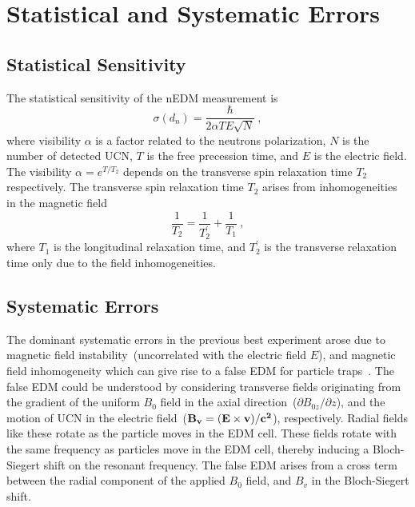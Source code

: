 \section{Statistical and Systematic Errors}
\subsection{Statistical Sensitivity}
The statistical sensitivity of the nEDM measurement is
\begin{equation}
  \label{eqn:dnsensitivity}
  \sigma(d_n) = \frac{\hbar}{2 \alpha T E \sqrt{N}}~,
\end{equation}
where visibility $\alpha$ is a factor related to the neutrons
polarization, $N$ is the number of detected UCN, $T$ is the free
precession time, and $E$ is the electric field. The visibility
$\alpha = e^{T/T_2}$ depends on the transverse spin relaxation time
$T_2$ respectively. The transverse spin relaxation time $T_2$ arises
from inhomogeneities in the magnetic field 
\begin{equation}
\frac{1}{T_2} = \frac{1}{T_2^{\prime}}+\frac{1}{T_1}~,
\end{equation}
where $T_1$ is the longitudinal relaxation time, and $T_2^{\prime}$ is
the transverse relaxation time only due to the field inhomogeneities.

\subsection{Systematic Errors~\label{sec:systematics}}

The dominant systematic errors in the previous best experiment arose
due to magnetic field instability~(uncorrelated with the electric
field $E$), and magnetic field inhomogeneity which can give rise to a
false EDM for particle traps~\cite{pendlebury2004}.
The false EDM could be understood by considering transverse fields
originating from the gradient of the uniform $B_0$ field in the axial
direction~($\partial{B_{0z}}/\partial{z}$), and the motion of UCN in
the electric field~($\bf{B_v} =(\bf{E} \times \bf{v})/c^2 $),
respectively. Radial fields like these rotate as the particle moves in
the EDM cell.  These fields rotate with the same frequency as
particles move in the EDM cell, thereby inducing a Bloch-Siegert shift
on the resonant frequency. The false EDM arises from a cross term
between the radial component of the applied $B_0$ field, and $B_v$ in
the Bloch-Siegert shift.

